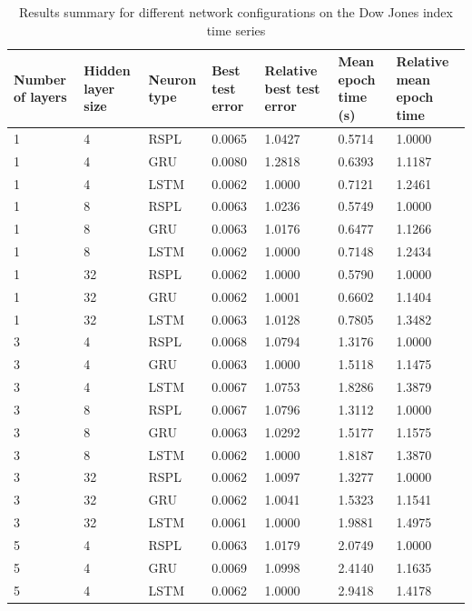 \documentclass[sn-apa]{sn-jnl}%
\begin{document}
\begin{table}[H]
\caption{Results summary for different network configurations on the Dow Jones index time series}
\begin{tabular}{|p{1.4cm}|p{1.4cm}|p{1.4cm}|p{1.5cm}|p{2.5cm}|p{1.9cm}|p{2cm}|}
\hline
Number of layers & Hidden layer size & Neuron type & Best test error & Relative best test error & Mean epoch time (s) & Relative mean epoch time\\
\hline
 1 &   4 &   RSPL & 0.0065 & 1.0427 & 0.5714 &  1.0000 \\
\hline
 1 &   4 &   GRU & 0.0080 & 1.2818 & 0.6393 &  1.1187 \\
\hline
 1 &   4 &  LSTM & 0.0062 & 1.0000 & 0.7121 &  1.2461 \\
\hline
 1 &   8 &   RSPL & 0.0063 & 1.0236 & 0.5749 &  1.0000 \\
\hline
 1 &   8 &   GRU & 0.0063 & 1.0176 & 0.6477 &  1.1266 \\
\hline
 1 &   8 &  LSTM & 0.0062 & 1.0000 & 0.7148 &  1.2434 \\
\hline
 1 &  32 &   RSPL & 0.0062 & 1.0000 & 0.5790 &  1.0000 \\
\hline
 1 &  32 &   GRU & 0.0062 & 1.0001 & 0.6602 &  1.1404 \\
\hline
 1 &  32 &  LSTM & 0.0063 & 1.0128 & 0.7805 &  1.3482 \\
\hline
 3 &   4 &   RSPL & 0.0068 & 1.0794 & 1.3176 &  1.0000 \\
\hline
 3 &   4 &   GRU & 0.0063 & 1.0000 & 1.5118 &  1.1475 \\
\hline
 3 &   4 &  LSTM & 0.0067 & 1.0753 & 1.8286 &  1.3879 \\
\hline
 3 &   8 &   RSPL & 0.0067 & 1.0796 & 1.3112 &  1.0000 \\
\hline
 3 &   8 &   GRU & 0.0063 & 1.0292 & 1.5177 &  1.1575 \\
\hline
 3 &   8 &  LSTM & 0.0062 & 1.0000 & 1.8187 &  1.3870 \\
\hline
 3 &  32 &   RSPL & 0.0062 & 1.0097 & 1.3277 &  1.0000 \\
\hline
 3 &  32 &   GRU & 0.0062 & 1.0041 & 1.5323 &  1.1541 \\
\hline
 3 &  32 &  LSTM & 0.0061 & 1.0000 & 1.9881 &  1.4975 \\
\hline
 5 &   4 &   RSPL & 0.0063 & 1.0179 & 2.0749 &  1.0000 \\
\hline
 5 &   4 &   GRU & 0.0069 & 1.0998 & 2.4140 &  1.1635 \\
\hline
 5 &   4 &  LSTM & 0.0062 & 1.0000 & 2.9418 &  1.4178 \\

\end{tabular}
\end{table}
\end{document}
